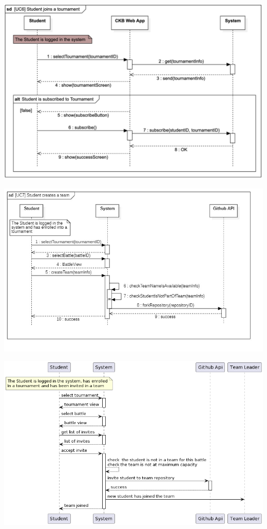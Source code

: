 \documentclass{article}
\begin{document}
\begin{center}
    \includegraphics[width=\linewidth]{image14.png}
  \label{fig:uc6}
\end{center}
\begin{center}
    \includegraphics[width=\linewidth]{uc7.jpg}
  \label{fig:uc7}
\end{center}

\begin{center}
    \includegraphics[width=\linewidth]{image11.png}
  \label{fig:uc8}
\end{center}
\end{document}
